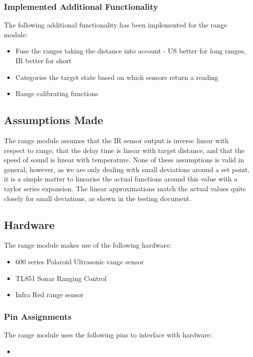 \documentclass[]{report}
\begin{document}
\subsubsection{Implemented Additional Functionality}
The following additional functionality has been implemented for the range module:
\begin{itemize}
	\item Fuse the ranges taking the distance into account - US better for long ranges, IR better for short
	\item Categorise the target state based on which sensors return a reading
	\item Range calibrating functions
\end{itemize}


\subsection{Assumptions Made}
The range module assumes that the IR sensor output is inverse linear with respect to range, that the delay time is linear with target distance, and that the speed of sound is linear with temperature. None of these assumptions is valid in general, however, as we are only dealing with small deviations around a set point, it is a simple matter to linearise the actual functions around this value with a taylor series expansion. The linear approximations match the actual values quite closely for small deviations, as shown in the testing document.

\subsection{Hardware}
The range module makes use of the following hardware:
\begin{itemize}
	\item 600 series Polaroid Ultrasonic range sensor
	\item TL851 Sonar Ranging Control
	\item Infra Red range sensor
\end{itemize}

\subsubsection{Pin Assignments}
The range module uses the following pins to interface with hardware:
\begin{itemize}
	\item 
\end{itemize}
\end{document}
